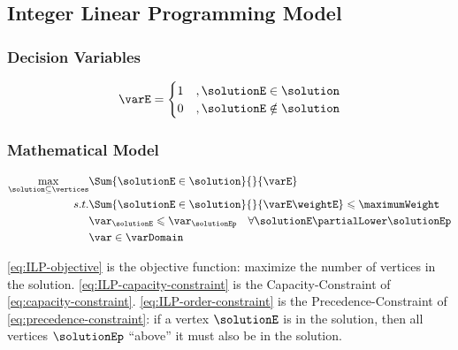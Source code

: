 \subsection{Integer Linear Programming Model}

\subsubsection{Decision Variables}

\begin{equation}
    \label{eq:decision-variables}
    \varE =  \begin{cases}
      1 &, \solutionE \in \solution \\
      0 &, \solutionE \notin \solution
   \end{cases}
\end{equation}

\subsubsection{Mathematical Model}

\begin{align}
    \label{eq:ILP-objective}
    \max\limits_{\solution \subseteq \vertices}
        & \Sum{\solutionE \in \solution}{}{\varE} \\
    s.t.
    \label{eq:ILP-capacity-constraint}
    & \Sum{\solutionE \in \solution}{}{\varE \weightE} \leqslant \maximumWeight \\
    \label{eq:ILP-order-constraint}
    & \var_{\solutionE} \leqslant \var_{\solutionEp} \quad \forall \solutionE \partialLower \solutionEp \\
    \label{eq:ILP-binary-constraint}
    & \var \in \varDomain
\end{align}

\eqref{eq:ILP-objective} is the objective function: maximize the number of vertices in the solution.
\eqref{eq:ILP-capacity-constraint} is the Capacity-Constraint of \eqref{eq:capacity-constraint}.
\eqref{eq:ILP-order-constraint} is the Precedence-Constraint of \eqref{eq:precedence-constraint}: if a vertex $\solutionE$ is in the solution, then all vertices $\solutionEp$ ``above'' it must also be in the solution.
